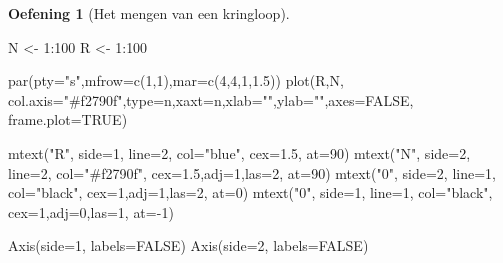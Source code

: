 \documentclass[
  a4paper,
]{scrbook}
\newenvironment{Shaded}{\begin{snugshade}}{\end{snugshade}}
\newcommand{\AttributeTok}[1]{\textcolor[rgb]{0.40,0.45,0.13}{#1}}
\newcommand{\ConstantTok}[1]{\textcolor[rgb]{0.56,0.35,0.01}{#1}}
\newcommand{\DecValTok}[1]{\textcolor[rgb]{0.68,0.00,0.00}{#1}}
\newcommand{\FloatTok}[1]{\textcolor[rgb]{0.68,0.00,0.00}{#1}}
\newcommand{\FunctionTok}[1]{\textcolor[rgb]{0.28,0.35,0.67}{#1}}
\newcommand{\NormalTok}[1]{\textcolor[rgb]{0.00,0.23,0.31}{#1}}
\newcommand{\OtherTok}[1]{\textcolor[rgb]{0.00,0.23,0.31}{#1}}
\newcommand{\SpecialCharTok}[1]{\textcolor[rgb]{0.37,0.37,0.37}{#1}}
\newcommand{\StringTok}[1]{\textcolor[rgb]{0.13,0.47,0.30}{#1}}
\theoremstyle{definition}
\newtheorem{exercise}{Oefening}[chapter]
\theoremstyle{remark}
\begin{document}
\begin{exercise}[Het mengen van een
kringloop]
\begin{Shaded}
\begin{Highlighting}[]
\NormalTok{N }\OtherTok{\textless{}{-}} \DecValTok{1}\SpecialCharTok{:}\DecValTok{100}
\NormalTok{R }\OtherTok{\textless{}{-}} \DecValTok{1}\SpecialCharTok{:}\DecValTok{100}

\FunctionTok{par}\NormalTok{(}\AttributeTok{pty=}\StringTok{"s"}\NormalTok{,}\AttributeTok{mfrow=}\FunctionTok{c}\NormalTok{(}\DecValTok{1}\NormalTok{,}\DecValTok{1}\NormalTok{),}\AttributeTok{mar=}\FunctionTok{c}\NormalTok{(}\DecValTok{4}\NormalTok{,}\DecValTok{4}\NormalTok{,}\DecValTok{1}\NormalTok{,}\FloatTok{1.5}\NormalTok{))}
\FunctionTok{plot}\NormalTok{(R,N,  }\AttributeTok{col.axis=}\StringTok{"\#f2790f"}\NormalTok{,}\AttributeTok{type=}\StringTok{\textquotesingle{}n\textquotesingle{}}\NormalTok{,}\AttributeTok{xaxt=}\StringTok{\textquotesingle{}n\textquotesingle{}}\NormalTok{,}\AttributeTok{xlab=}\StringTok{""}\NormalTok{,}\AttributeTok{ylab=}\StringTok{""}\NormalTok{,}\AttributeTok{axes=}\ConstantTok{FALSE}\NormalTok{, }\AttributeTok{frame.plot=}\ConstantTok{TRUE}\NormalTok{)}

\FunctionTok{mtext}\NormalTok{(}\StringTok{"R"}\NormalTok{, }\AttributeTok{side=}\DecValTok{1}\NormalTok{, }\AttributeTok{line=}\DecValTok{2}\NormalTok{, }\AttributeTok{col=}\StringTok{"blue"}\NormalTok{, }\AttributeTok{cex=}\FloatTok{1.5}\NormalTok{, }\AttributeTok{at=}\DecValTok{90}\NormalTok{)}
\FunctionTok{mtext}\NormalTok{(}\StringTok{"N"}\NormalTok{, }\AttributeTok{side=}\DecValTok{2}\NormalTok{, }\AttributeTok{line=}\DecValTok{2}\NormalTok{, }\AttributeTok{col=}\StringTok{"\#f2790f"}\NormalTok{, }\AttributeTok{cex=}\FloatTok{1.5}\NormalTok{,}\AttributeTok{adj=}\DecValTok{1}\NormalTok{,}\AttributeTok{las=}\DecValTok{2}\NormalTok{, }\AttributeTok{at=}\DecValTok{90}\NormalTok{)}
\FunctionTok{mtext}\NormalTok{(}\StringTok{"0"}\NormalTok{, }\AttributeTok{side=}\DecValTok{2}\NormalTok{, }\AttributeTok{line=}\DecValTok{1}\NormalTok{, }\AttributeTok{col=}\StringTok{"black"}\NormalTok{, }\AttributeTok{cex=}\DecValTok{1}\NormalTok{,}\AttributeTok{adj=}\DecValTok{1}\NormalTok{,}\AttributeTok{las=}\DecValTok{2}\NormalTok{, }\AttributeTok{at=}\DecValTok{0}\NormalTok{)}
\FunctionTok{mtext}\NormalTok{(}\StringTok{"0"}\NormalTok{, }\AttributeTok{side=}\DecValTok{1}\NormalTok{, }\AttributeTok{line=}\DecValTok{1}\NormalTok{, }\AttributeTok{col=}\StringTok{"black"}\NormalTok{, }\AttributeTok{cex=}\DecValTok{1}\NormalTok{,}\AttributeTok{adj=}\DecValTok{0}\NormalTok{,}\AttributeTok{las=}\DecValTok{1}\NormalTok{, }\AttributeTok{at=}\SpecialCharTok{{-}}\DecValTok{1}\NormalTok{)}

\FunctionTok{Axis}\NormalTok{(}\AttributeTok{side=}\DecValTok{1}\NormalTok{, }\AttributeTok{labels=}\ConstantTok{FALSE}\NormalTok{)}
\FunctionTok{Axis}\NormalTok{(}\AttributeTok{side=}\DecValTok{2}\NormalTok{, }\AttributeTok{labels=}\ConstantTok{FALSE}\NormalTok{)}


\end{Highlighting}
\end{Shaded}
\end{exercise}
\end{document}
